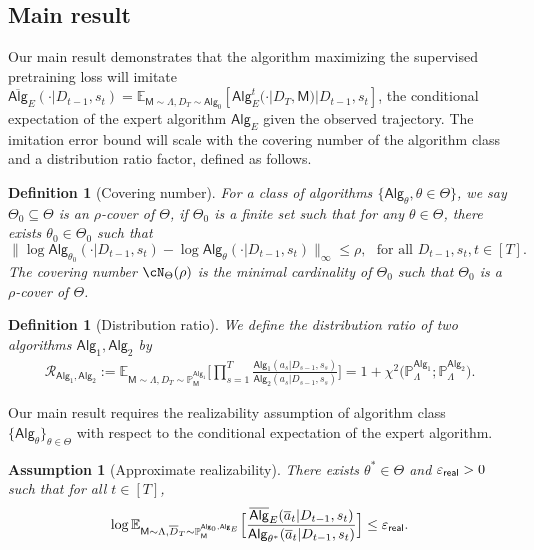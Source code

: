 \documentclass[10pt]{article}
\newtheorem{definition}[theorem]{Definition}
\newtheorem{assumption}{Assumption}
\renewcommand{\epsilon}{\varepsilon}
\newcommand{\<}{\left\langle}
\renewcommand{\>}{\right\rangle}
\newcommand{\E}{\mathbb{E}}
\renewcommand{\P}{\mathbb{P}}
\newcommand{\inst}{{\mathsf{M}}}
\newcommand{\widebar}[1]{\overline{#1}}
\newcommand{\state}{{s}}
\newcommand{\action}{{a}}
\newcommand{\eaction}{{\widebar{a}}}
\newcommand{\totlen}{{T}}
\newcommand{\sAlg}{{\mathsf{Alg}}}
\newcommand{\osAlg}{\overline{\mathsf{Alg}}}
\newcommand{\dset}{{D}}
\newcommand{\adset}{{\widebar{D}}}
\newcommand{\Par}{{\theta}}
\newcommand{\Parspace}{{\Theta}}
\newcommand{\TruePar}{{\theta^*}}
\newcommand{\prior}{{\Lambda}}
\newcommand{\shortexp}{{E}}
\newcommand{\geneps}{{\epsilon}_{\sf real}}
\newcommand{\distratio}{{\mathcal{R}}}
\begin{document}
\subsection{Main result}
Our main result demonstrates that the algorithm maximizing the supervised pretraining loss will imitate $\osAlg_{\shortexp}(\cdot|\dset_{t-1},\state_t) = \E_{\inst\sim \prior,  \dset_{\totlen} \sim \sAlg_0}[\sAlg_{\shortexp}^t(\cdot|\dset_\totlen,\inst)|\dset_{t-1},\state_t]$, the conditional expectation of the expert algorithm $\sAlg_{\shortexp}$ given the observed trajectory. The imitation error bound will scale with the covering number of the algorithm class and a  distribution ratio factor, defined as follows.
\begin{definition}[Covering number]\label{def:cover_number_general} For a class of algorithms $\{\sAlg_\Par,\Par\in\Parspace\}$,
we say $\Parspace_0 \subseteq\Parspace$ is an  $\rho$-cover of $\Parspace$, if $\Parspace_0$ is a finite set such that for any $\Par\in\Parspace$, there exists $\Par_0\in\Parspace_0$ such that
\[
\|\log \sAlg_{\Par_0}(\cdot|\dset_{t-1},\state_t)-\log \sAlg_{\Par}(\cdot|\dset_{t-1},\state_t)\|_{\infty}\leq\rho,~~~ \text{for all } \dset_{t-1},\state_t, t\in[\totlen].
\]
The covering number $\cN_{\Parspace}(\rho)$ is the minimal cardinality of $\Parspace_0$ such that $\Parspace_0$ is a $\rho$-cover of $\Parspace$.
\end{definition}
\begin{definition}[Distribution ratio]\label{def:dist_ratio}
\label{def:distribution-ratio}
We define the distribution ratio of two algorithms $\sAlg_1,\sAlg_2$ by
\begin{align*}\distratio_{\sAlg_1,\sAlg_2}
:=
\E_{\inst\sim\prior,\dset_\totlen\sim\P_\inst^{\sAlg_1}}
\Big[\prod_{s=1}^{\totlen}\frac{\sAlg_1(\action_s|\dset_{s-1},\state_s)}{\sAlg_2(\action_s|\dset_{s-1},\state_s)}\Big] = 1 + \chi^2\Big( \P_\prior^{\sAlg_1};\P_\prior^{\sAlg_2} \Big).
\end{align*}
\end{definition}
Our main result requires the realizability assumption of algorithm class $\{ \sAlg_\Par\}_{\Par \in \Parspace}$ with respect to the conditional expectation of the expert algorithm.
\begin{assumption}[Approximate realizability]
\label{asp:realizability}
There exists $\TruePar\in\Parspace$ and $\geneps > 0$ such that for all $t\in[\totlen]$,
\begin{align}
\label{eqn:plc_approx_general}
\log\E_{\inst \sim \prior, \adset_\totlen \sim \P_{\inst}^{\sAlg_0,\sAlg_\shortexp}}\Big[\frac{\osAlg_{\shortexp}(\eaction_t|\dset_{t-1},\state_t )}{\sAlg_\TruePar(\eaction_t|\dset_{t-1},\state_t )}\Big] \le \geneps.
\end{align}
\end{assumption}
\end{document}
